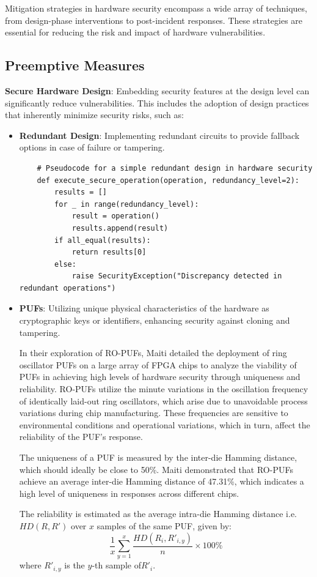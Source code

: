 Mitigation strategies in hardware security encompass a wide array of
techniques, from design-phase interventions to post-incident responses.
These strategies are essential for reducing the risk and impact of
hardware vulnerabilities.

\hypertarget{preemptive-measures}{%
\subsection{Preemptive Measures}\label{preemptive-measures}}

\textbf{Secure Hardware Design}: Embedding security features at the
design level can significantly reduce vulnerabilities. This includes the
adoption of design practices that inherently minimize security risks,
such as:

\begin{itemize}
\item
  \textbf{Redundant Design}: Implementing redundant circuits to provide
  fallback options in case of failure or tampering.

  \begin{verbatim}
    # Pseudocode for a simple redundant design in hardware security
    def execute_secure_operation(operation, redundancy_level=2):
        results = []
        for _ in range(redundancy_level):
            result = operation()
            results.append(result)
        if all_equal(results):
            return results[0] 
        else:
            raise SecurityException("Discrepancy detected in redundant operations")
    \end{verbatim}
    
\item
  \textbf{PUFs}: Utilizing unique
  physical characteristics of the hardware as cryptographic keys or
  identifiers, enhancing security against cloning and tampering.

  In their exploration of RO-PUFs\cite{maitiLargeScaleCharacterization2010}, Maiti detailed the deployment of ring oscillator PUFs on a large array of FPGA chips to analyze the viability of PUFs in achieving high levels of hardware security through uniqueness and reliability. RO-PUFs utilize the minute variations in the oscillation frequency of identically laid-out ring oscillators, which arise due to unavoidable process variations during chip manufacturing. These frequencies are sensitive to environmental conditions and operational variations, which in turn, affect the reliability of the PUF's response.

  The uniqueness of a PUF is measured by the inter-die Hamming distance, which should ideally be close to 50\%. Maiti demonstrated that RO-PUFs achieve an average inter-die Hamming distance of 47.31\%, which indicates a high level of uniqueness in responses across different chips.

  The reliability is estimated as the average intra-die Hamming distance i.e. $HD(R, R')$ over $x$ samples of the same PUF, given by:
\[
\frac{1}{x} \sum_{y=1}^{x} \frac{HD(R_{i}, R'_{i,y})}{n} \times 100\%
\]
  where $R'_{i,y}$ is the $y$-th sample of$R'_{i}$.
\end{itemize}

